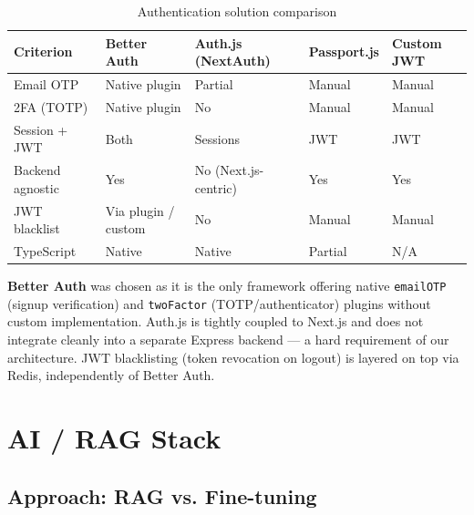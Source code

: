 \begin{table}[H]
\centering
\caption{Authentication solution comparison}
\begin{tabularx}{\textwidth}{|l|X|X|X|X|}
\hline
\rowcolor{gray!20}
\textbf{Criterion} & \textbf{Better Auth} & \textbf{Auth.js (NextAuth)} & \textbf{Passport.js} & \textbf{Custom JWT} \\
\hline
Email OTP & \cellcolor{green!15}Native plugin & Partial & Manual & Manual \\
\hline
2FA (TOTP) & \cellcolor{green!15}Native plugin & No & Manual & Manual \\
\hline
Session + JWT & \cellcolor{green!15}Both & Sessions & JWT & JWT \\
\hline
Backend agnostic & \cellcolor{green!15}Yes & No (Next.js-centric) & Yes & Yes \\
\hline
JWT blacklist & \cellcolor{green!15}Via plugin / custom & No & Manual & Manual \\
\hline
TypeScript & \cellcolor{green!15}Native & Native & Partial & N/A \\
\hline
\end{tabularx}
\end{table}

\textbf{Better Auth} was chosen as it is the only framework offering native
\texttt{emailOTP} (signup verification) and \texttt{twoFactor} (TOTP/authenticator)
plugins without custom implementation.
Auth.js is tightly coupled to Next.js and does not integrate cleanly into a
separate Express backend --- a hard requirement of our architecture.
JWT blacklisting (token revocation on logout) is layered on top via Redis,
independently of Better Auth.

\section{AI / RAG Stack}

\subsection{Approach: RAG vs. Fine-tuning}


